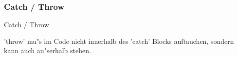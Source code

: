 \documentclass{beamer}
\begin{document}
\begin{frame}
  \frametitle{Catch / Throw}
  Catch / Throw
  
\vspace{3ex}'throw' mu"s im Code nicht innerhalb des 'catch' Blocks auftauchen, sondern kann auch au"serhalb stehen.
\end{frame}

\end{document}
